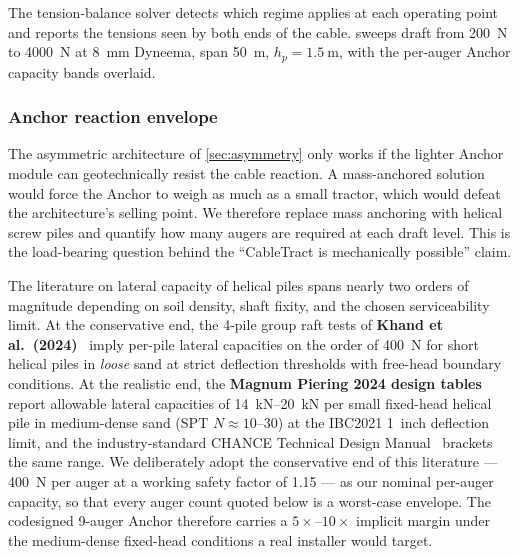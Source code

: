 \documentclass[11pt,a4paper]{article}
\begin{document}
The tension-balance solver detects which regime applies at each operating point and reports the tensions seen by both ends of the cable.  sweeps draft from \SI{200}{\newton} to \SI{4000}{\newton} at \SI{8}{\milli\meter} Dyneema, span \SI{50}{\meter}, $h_p = \SI{1.5}{\meter}$, with the per-auger Anchor capacity bands overlaid.

\subsubsection{Anchor reaction envelope}\label{sec:anchor}

The asymmetric architecture of \cref{sec:asymmetry} only works if the lighter Anchor module can geotechnically resist the cable reaction. A mass-anchored solution would force the Anchor to weigh as much as a small tractor, which would defeat the architecture's selling point. We therefore replace mass anchoring with helical screw piles and quantify how many augers are required at each draft level. This is the load-bearing question behind the ``CableTract is mechanically possible'' claim.

The literature on lateral capacity of helical piles spans nearly two orders of magnitude depending on soil density, shaft fixity, and the chosen serviceability limit. At the conservative end, the 4-pile group raft tests of \textbf{Khand et al.\ (2024)}~\cite{khand2024helical} imply per-pile lateral capacities on the order of \SI{400}{\newton} for short helical piles in \emph{loose} sand at strict deflection thresholds with free-head boundary conditions. At the realistic end, the \textbf{Magnum Piering 2024 design tables}~\cite{magnum2024fixed} report allowable lateral capacities of \SIrange{14}{20}{\kilo\newton} per small fixed-head helical pile in medium-dense sand (SPT $N \approx 10$--$30$) at the IBC2021 \SI{1}{inch} deflection limit, and the industry-standard CHANCE Technical Design Manual~\cite{chance2024manual} brackets the same range. We deliberately adopt the conservative end of this literature --- \SI{400}{\newton} per auger at a working safety factor of 1.15 --- as our nominal per-auger capacity, so that every auger count quoted below is a worst-case envelope. The codesigned 9-auger Anchor therefore carries a $5\times$--$10\times$ implicit margin under the medium-dense fixed-head conditions a real installer would target.
\end{document}
